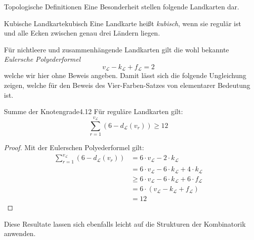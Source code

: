 \begin{section}{Topologische Definitionen}
 Eine Besonderheit stellen folgende Landkarten dar.
 
 \begin{definitionl}{Kubische Landkarte}{kubisch}
  Eine Landkarte heißt \textit{kubisch}, wenn sie regulär ist und alle Ecken zwischen genau drei Ländern liegen.
 \end{definitionl}

 Für nichtleere und zusammenhängende Landkarten gilt die wohl bekannte \textit{Eulersche Polyederformel}
 \[v_\mathcal{L} - k_\mathcal{L} + f_\mathcal{L} = 2\]
 welche wir hier ohne Beweis angeben. Damit lässt sich die folgende Ungleichung zeigen, welche für den Beweis des Vier-Farben-Satzes von elementarer Bedeutung ist.
 
 \begin{satzl}{Summe der Knotengrade}{4.12}
  Für reguläre Landkarten gilt: \[\sum_{r=1}^{v_\mathcal{L}} (6-d_\mathcal{L}(v_r)) \geq 12\]
 \end{satzl}
 \begin{proof}
  Mit der Eulerschen Polyederformel gilt:
  \begin{align*}
    \sum_{r=1}^{v_\mathcal{L}} (6-d_\mathcal{L}(v_r)) &= 6\cdot v_\mathcal{L}-2\cdot k_\mathcal{L}\\
    &= 6\cdot v_\mathcal{L} - 6\cdot k_\mathcal{L} + 4\cdot k_\mathcal{L}\\
    &\geq 6\cdot v_\mathcal{L} - 6\cdot k_\mathcal{L} + 6\cdot f_\mathcal{L}\\
    &= 6\cdot (v_\mathcal{L} - k_\mathcal{L} + f_\mathcal{L})\\
    &= 12
  \end{align*}
 \end{proof}

 Diese Resultate lassen sich ebenfalls leicht auf die Strukturen der Kombinatorik anwenden.

\end{section}